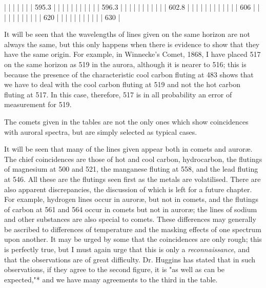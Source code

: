 \documentclass[a4paper, 12pt, oneside, polutonikogreek, english]{article}
\begin{document}
|            |             |                 |              |             |         | 595.3           |         |              |            |
|            |             |                 |              |             |         | 596.3           |         |              |            |
|            |             |                 |              |             |         | 602.8           |         |              |            |
|            |             |                 |              |             |         |              | 606       |              |            |
|            |             |                 |              |             |         |              | 620       |              |            |
|            |             |                 |              |             |         |              | 630       |

It will be seen that the wavelengths of lines given on the same horizon are not always the same, but this only happens when there is evidence to show that they have the same origin. For example, in Winnecke's Comet, 1868, I have placed 517 on the same horizon as 519 in the aurora, although it is nearer to 516; this is because the presence of the characteristic cool carbon fluting at 483 shows that we have to deal with the cool carbon fluting at 519 and not the hot carbon fluting at 517. In this case, therefore, 517 is in all probability an error of measurement for 519.

The comets given in the tables are not the only ones which show coincidences with auroral spectra, but are simply selected as typical cases.

It will be seen that many of the lines given appear both in comets and auroræ. The chief coincidences are those of hot and cool carbon, hydrocarbon, the flutings of magnesium at 500 and 521, the manganese fluting at 558, and the lead fluting at 546. All these are the flutings seen first as the metals are volatilised. There are also apparent discrepancies, the discussion of which is left for a future chapter. For example, hydrogen lines occur in auroræ, but not in comets, and the flutings of carbon at 561 and 564 occur in comets but not in auroræ; the lines of sodium and other substances are also special to comets. These differences may generally be ascribed to differences of temperature and the masking effects of one spectrum upon another. It may be urged by some that the coincidences are only rough; this is perfectly true, but I must again urge that this is only a \emph{reconnaissance}, and that the observations are of great difficulty. Dr. Huggins has stated that in such observations, if they agree to the second figure, it is "as well as can be expected,"* and we have many agreements to the third in the table.
\end{document}
